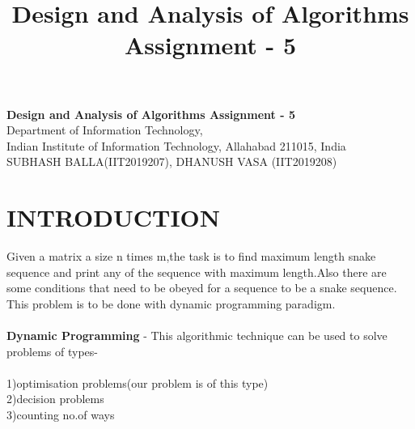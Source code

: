 \documentclass[10pt]{article}
\author{}
\title{\Large{Design and Analysis of Algorithms Assignment - 5}}
\begin{document}
	\begin{center}
		{\Large \textbf{Design and Analysis of Algorithms Assignment - 5}}\\
		\vspace{1em}
		{\large Department of Information Technology,}\\
		\vspace{1em}
		\large{Indian Institute of Information Technology, Allahabad 211015, India}\\
		\vspace{1em}
		\large{SUBHASH BALLA(IIT2019207), DHANUSH VASA (IIT2019208)}
		\vspace{2.5em}

	\end{center}

\iffalse
    \textbf{\emph{{Abstract}: The problem is to find out the two polynomials represented by two arrays of a function.   In  this  paper,  this  triv-ial  problem  of  finding  that multiplies given two polynomials  has  been  solved  using  thetechniques  and  ideas  based  on  Divide  and  Con-quer  Programming  Paradigm.   Also,  this  paperdiscuss  the  distance  between  these  polynomials of two arrays also.   Using  the  Divide  and  Conquerapproach,  the  algorithm  achieves  its  best  timecomplexity of O(n),thus reducing the time toa  much  significant  extent.  Thus  the  approach  ofDivide and Conquer exhibits the logarithmic timeand speeds up the mechanism of finding the multiples of given two polinomials.this divide and conquer algorithm recursively breaks down a problem into two or more sub problems.}}\\

	\textbf{\emph{{Index Terms}: Arrays, Divide and Conquer, Merge Sort, Sorting , Points\\}}
\fi

\section*{INTRODUCTION}

Given a matrix a size n times m,the task is to find maximum length snake sequence and print any of the sequence with maximum length.Also there are some conditions that need to be obeyed for a sequence to be a snake sequence.
This problem is to be done with dynamic programming paradigm.\\\\
\textbf{Dynamic Programming} -  This algorithmic technique can be used to solve problems of types-\\\\
1)optimisation problems(our problem is of this type)\\
2)decision problems\\
3)counting no.of ways\\
\end{document}
